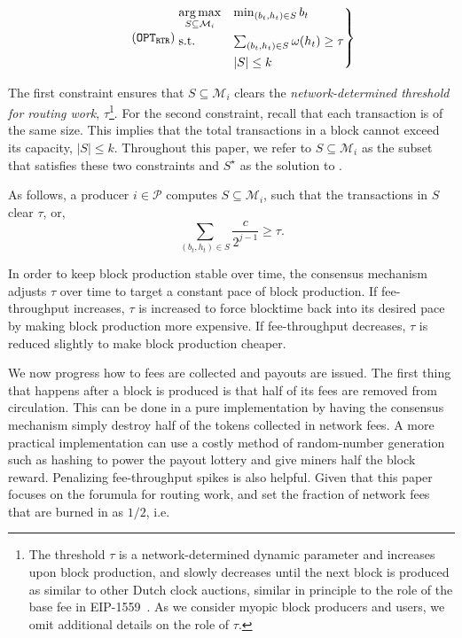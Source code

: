\begin{align}\tag{\ourOPT}
    \begin{rcases}
        \underset{S\subseteq \mathcal{M}_i}{\mbox{arg}\max} & \min_{(b_t,h_t)\in S}  b_t \\
       \mbox{{s.t.}}\  & \sum_{(b_t,h_t)\in S} \omega(h_t) \geq \tau \\
       & |S| \leq k\\
   \end{rcases}
\end{align}

The first constraint ensures that $S\subseteq \mathcal{M}_i$ clears the \textit{network-determined threshold for routing work}, $\tau$\footnote{The threshold $\tau$ is a network-determined dynamic parameter and increases upon block production, and slowly decreases until the next block is produced as similar to other Dutch clock auctions, similar in principle to the role of the base fee in EIP-1559~\cite{buterin2019eip}. As we consider myopic block producers and users, we omit additional details on the role of $\tau$.}. For the second constraint, recall that each transaction is of the same size. This implies that the total transactions in a block cannot exceed its capacity, $|S| \leq k$. Throughout this paper, we refer to $S\subseteq \mathcal{M}_i$ as the subset that satisfies these two constraints and $S^\star$ as the solution to \ourOPT.

As follows, a producer $i \in \mathcal{P}$ computes $S \subseteq \mathcal{M}_i$, such that the transactions in $S$ clear $\tau$, or,
$$
\sum_{(b_t,h_t) \in S} \frac{c}{2^{j-1}} \geq \tau.
$$

In order to keep block production stable over time, the consensus mechanism adjusts $\tau$ over time to target a constant pace of block production. If fee-throughput increases, $\tau$ is increased to force blocktime back into its desired pace by making block production more expensive. If fee-throughput decreases, $\tau$ is reduced slightly to make block production cheaper.

We now progress how to fees are collected and payouts are issued. The first thing that happens after a block is produced is that half of its fees are removed from circulation. This can be done in a pure implementation by having the consensus mechanism simply destroy half of the tokens collected in network fees. A more practical implementation can use a costly method of random-number generation such as hashing to power the payout lottery and give miners half the block reward. Penalizing fee-throughput spikes is also helpful. Given that this paper focuses on the forumula for routing work, and set the fraction of network fees that are burned in \ourTFM  as $1/2$, i.e.

